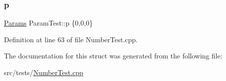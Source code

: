 \subsubsection{\texorpdfstring{p}{p}}
{\footnotesize\ttfamily \hyperlink{struct_params}{Params} Param\+Test\+::p \{0,0,0\}}



Definition at line 63 of file Number\+Test.\+cpp.



The documentation for this struct was generated from the following file\+:\begin{DoxyCompactItemize}
\item 
src/tests/\hyperlink{_number_test_8cpp}{Number\+Test.\+cpp}\end{DoxyCompactItemize}
